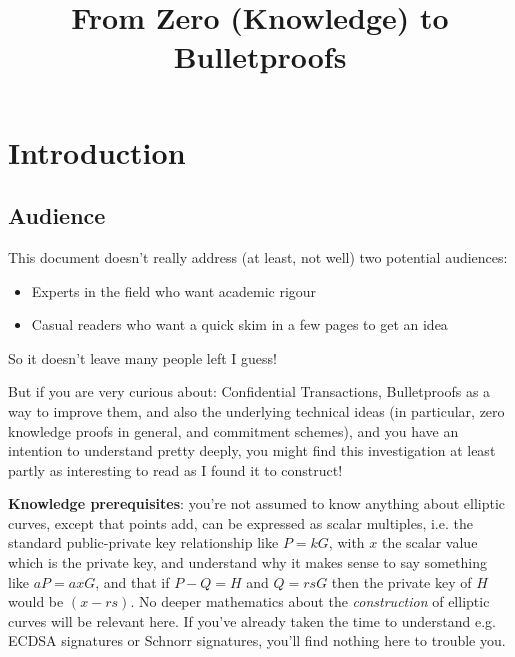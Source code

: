 \documentclass[10pt,a4paper]{article}
\providecommand{\tightlist}{%
  \setlength{\itemsep}{0pt}\setlength{\parskip}{0pt}}
\begin{document}
\title{From Zero (Knowledge) to Bulletproofs}
\maketitle


\hypertarget{introduction}{%
\section[Introduction]{\texorpdfstring{\protect\hypertarget{anchor}{}{}Introduction}{Introduction}}\label{introduction}}

\hypertarget{audience}{%
\subsection[Audience]{\texorpdfstring{\protect\hypertarget{anchor-1}{}{}Audience}{Audience}}\label{audience}}

This document doesn't really address (at least, not well) two potential
audiences:

\begin{itemize}
\tightlist
\item
  Experts in the field who want academic rigour
\item
  Casual readers who want a quick skim in a few pages to get an idea
\end{itemize}

So it doesn't leave many people left I guess!

But if you are very curious about: Confidential Transactions,
Bulletproofs as a way to improve them, and also the underlying technical
ideas (in particular, zero knowledge proofs in general, and commitment
schemes), and you have an intention to understand pretty deeply, you
might find this investigation at least partly as interesting to read as
I found it to construct!

\textbf{Knowledge prerequisites}: you're not assumed to know anything
about elliptic curves, except that points add, can be expressed as
scalar multiples, i.e. the standard public-private key relationship like
$P=kG$, with $x$ the scalar value which is the private key, and understand why it
makes sense to say something like $aP = axG$, and that if $P-Q=H$ and $Q=rsG$ then the private key
of $H$ would be $(x-rs)$. No deeper mathematics about the \emph{construction} of
elliptic curves will be relevant here. If you've already taken the time
to understand e.g. ECDSA signatures or Schnorr signatures, you'll find
nothing here to trouble you.
\end{document}

